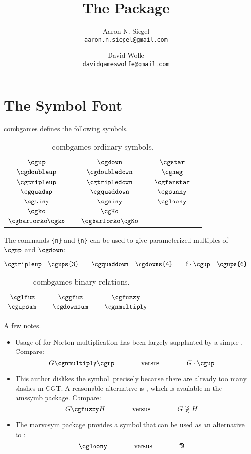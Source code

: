 \documentclass{article}
\title{The \combgames{} Package}
\author{Aaron N. Siegel\\\texttt{aaron.n.siegel@gmail.com} \and
        David Wolfe\\\texttt{davidgameswolfe@gmail.com}}
\newcommand\cn[1]{\texttt{\string#1}}
\newcommand\ds[1]{$#1$ & \cn{#1}}
\newcommand\combgames{\textsf{combgames}}
\begin{document}
\maketitle

\tableofcontents

\section{The Symbol Font}

\combgames{} defines the following symbols.

\begin{table}[H]
\centering
\begin{tabular}{clclcl}
\ds{\cgup} & \ds{\cgdown} & \ds{\cgstar} \bigstrut\\
\ds{\cgdoubleup} & \ds{\cgdoubledown} & \ds{\cgneg} \bigstrut\\
\ds{\cgtripleup} & \ds{\cgtripledown} & \ds{\cgfarstar} \bigstrut\\
\ds{\cgquadup} & \ds{\cgquaddown} & \ds{\cgsunny} \bigstrut\\
\ds{\cgtiny} & \ds{\cgminy} & \ds{\cgloony} \bigstrut\\
\ds{\cgko} & \ds{\cgKo} \bigstrut\\
\ds{\cgkobar} & \ds{\cgKobar} \bigstrut
\end{tabular}
\caption{\combgames{} ordinary symbols.}
\end{table}

The commands \cn{\cgups\{n\}} and \cn{\cgdowns\{n\}} can be used to give parameterized multiples of $\cgup$ and $\cgdown$:

\[
\cgups{3}\quad \cn{\cgups\{3\}}\qquad \cgdowns{4}\quad \cn{\cgdowns\{4\}} \qquad \cgups{6}\quad \cn{\cgups\{6\}}
  \]

\begin{table}[H]
\centering
\begin{tabular}{clclcl}
\ds{\cglfuz} & \ds{\cggfuz} & \ds{\cgfuzzy} \bigstrut\\
\ds{\cgupsum} & \ds{\cgdownsum} & \ds{\cgnmultiply} \bigstrut
\end{tabular}
\caption{\combgames{} binary relations.}
\end{table}

A few notes.

\begin{itemize}
\item Usage of \cn{\cgnmultiply} for Norton multiplication has been largely supplanted by a simple \cn{\cdot}.  Compare:
\[G \cgnmultiply \cgup \qquad\qquad \textrm{versus} \qquad\qquad G \cdot \cgup\]
\item This author dislikes the \cn{\cgfuzzy} symbol, precisely because there are already too many slashes in CGT.  A reasonable alternative is \cn{\not}\cn{\gtrless}, which is available in the \textsf{amssymb} package.  Compare:
\[G \cgfuzzy H \qquad\qquad \textrm{versus} \qquad\qquad G \not\gtrless H\]
\item The \textsf{marvosym} package provides a \cn{\Moon} symbol that can be used as an alternative to \cn{\cgloony}:
\[\cgloony \qquad\qquad \textrm{versus} \qquad\qquad \textrm{\Moon}\]
\end{itemize}
\end{document}
